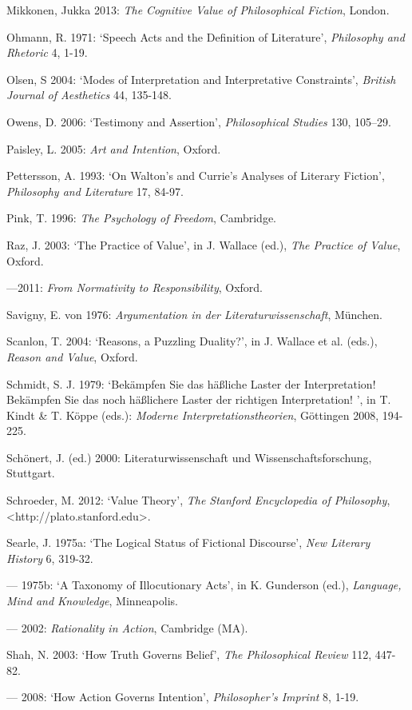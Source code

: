 \begin{hangparas}{.5cm}{1}
Mikkonen, Jukka 2013: \emph{The Cognitive Value of Philosophical Fiction}, London.

Ohmann, R. 1971: `Speech Acts and the Definition of Literature', \emph{Philosophy and Rhetoric} 4, 1-19.

Olsen, S 2004: `Modes of Interpretation and Interpretative Constraints', \emph{British Journal of Aesthetics} 44, 135-148.

Owens, D. 2006: `Testimony and Assertion', \emph{Philosophical Studies} 130, 105--29.

Paisley, L. 2005: \emph{Art and Intention}, Oxford.

Pettersson, A. 1993: `On Walton's and Currie's Analyses of Literary Fiction', \emph{Philosophy and Literature} 17, 84-97.

Pink, T. 1996: \emph{The Psychology of Freedom}, Cambridge.

Raz, J. 2003: `The Practice of Value', in J. Wallace (ed.), \emph{The Practice of Value}, Oxford.

---2011: \emph{From Normativity to Responsibility}, Oxford. 

Savigny, E. von 1976: \emph{Argumentation in der Literaturwissenschaft}, M\"unchen.

Scanlon, T. 2004: `Reasons, a Puzzling Duality?', in J. Wallace et al. (eds.), \emph{Reason and Value}, Oxford.

Schmidt, S. J. 1979: `Bek\"ampfen Sie das h\"a{\ss}liche Laster der Interpretation! Bek\"ampfen Sie das noch h\"a{\ss}lichere Laster der richtigen Interpretation! ', in T. Kindt \& T. K\"oppe (eds.): \emph{Moderne Interpretationstheorien}, G\"ottingen 2008, 194-225.

Sch\"onert, J. (ed.) 2000: Literaturwissenschaft und Wissenschaftsforschung, Stuttgart.

Schroeder, M. 2012: `Value Theory', \emph{The Stanford Encyclopedia of Philosophy}, \textless{}http://plato.stanford.edu\textgreater{}.

Searle, J. 1975a: `The Logical Status of Fictional Discourse', \emph{New Literary History} 6, 319-32.

--- 1975b: `A Taxonomy of Illocutionary Acts', in K. Gunderson (ed.), \emph{Language, Mind and Knowledge}, Minneapolis.

--- 2002: \emph{Rationality in Action}, Cambridge (MA). 

Shah, N. 2003: `How Truth Governs Belief', \emph{The Philosophical Review} 112, 447-82.

--- 2008: `How Action Governs Intention', \emph{Philosopher's Imprint} 8, 1-19.


\end{hangparas}
